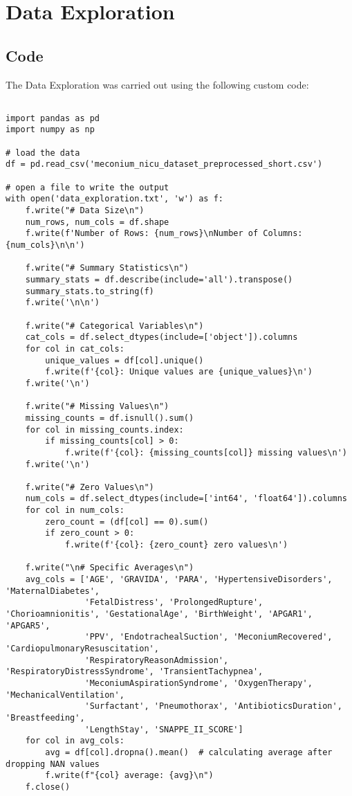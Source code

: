 \documentclass[11pt]{article}
\begin{document}
\section{Data Exploration} \subsection{Code}The Data Exploration was carried out using the following custom code:

\begin{verbatim}

import pandas as pd
import numpy as np

# load the data
df = pd.read_csv('meconium_nicu_dataset_preprocessed_short.csv')

# open a file to write the output 
with open('data_exploration.txt', 'w') as f:
    f.write("# Data Size\n")
    num_rows, num_cols = df.shape
    f.write(f'Number of Rows: {num_rows}\nNumber of Columns: {num_cols}\n\n')

    f.write("# Summary Statistics\n")
    summary_stats = df.describe(include='all').transpose() 
    summary_stats.to_string(f) 
    f.write('\n\n')

    f.write("# Categorical Variables\n")
    cat_cols = df.select_dtypes(include=['object']).columns
    for col in cat_cols:
        unique_values = df[col].unique()
        f.write(f'{col}: Unique values are {unique_values}\n')
    f.write('\n')

    f.write("# Missing Values\n")
    missing_counts = df.isnull().sum()
    for col in missing_counts.index:
        if missing_counts[col] > 0:
            f.write(f'{col}: {missing_counts[col]} missing values\n')
    f.write('\n')

    f.write("# Zero Values\n")
    num_cols = df.select_dtypes(include=['int64', 'float64']).columns
    for col in num_cols:
        zero_count = (df[col] == 0).sum()
        if zero_count > 0:
            f.write(f'{col}: {zero_count} zero values\n')

    f.write("\n# Specific Averages\n")
    avg_cols = ['AGE', 'GRAVIDA', 'PARA', 'HypertensiveDisorders', 'MaternalDiabetes',
                'FetalDistress', 'ProlongedRupture', 'Chorioamnionitis', 'GestationalAge', 'BirthWeight', 'APGAR1', 'APGAR5',
                'PPV', 'EndotrachealSuction', 'MeconiumRecovered', 'CardiopulmonaryResuscitation', 
                'RespiratoryReasonAdmission', 'RespiratoryDistressSyndrome', 'TransientTachypnea',
                'MeconiumAspirationSyndrome', 'OxygenTherapy', 'MechanicalVentilation',
                'Surfactant', 'Pneumothorax', 'AntibioticsDuration', 'Breastfeeding',
                'LengthStay', 'SNAPPE_II_SCORE']
    for col in avg_cols:
        avg = df[col].dropna().mean()  # calculating average after dropping NAN values
        f.write(f"{col} average: {avg}\n") 
    f.close()

\end{verbatim}
\end{document}
